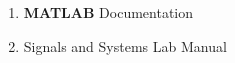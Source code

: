 \begin{enumerate}
    \item {\bf MATLAB} Documentation
    \item Signals and Systems Lab Manual
\end{enumerate}